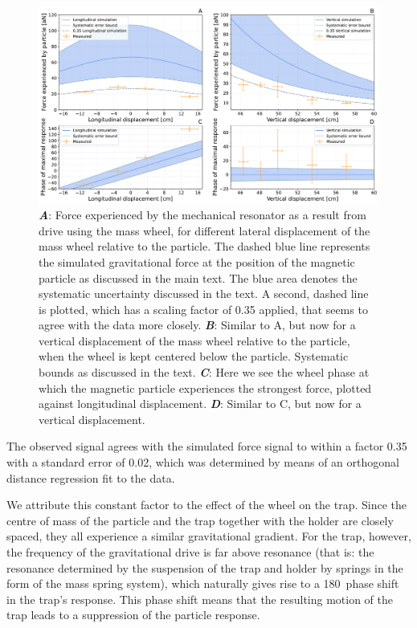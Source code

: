 \begin{figure}[ht]%
\centering
\includegraphics[width=\textwidth]{Results/paper_full_combined.pdf}%
\caption{\textbf{\emph{A}}: Force experienced by the mechanical resonator as a result from drive using the mass wheel, for different lateral displacement of the mass wheel relative to the particle. The dashed blue line represents the simulated gravitational force at the position of the magnetic particle as discussed in the main text. The blue area denotes the systematic uncertainty discussed in the text. A second, dashed line is plotted, which has a scaling factor of 0.35 applied, that seems to agree with the data more closely. \textbf{\emph{B}}: Similar to A, but now for a vertical displacement of the mass wheel relative to the particle, when the wheel is kept centered below the particle. Systematic bounds as discussed in the text.   \textbf{\emph{C}}: Here we see the wheel phase at which the magnetic particle experiences the strongest force, plotted against longitudinal displacement. \textbf{\emph{D}}: Similar to C, but now for a vertical displacement.\\
}\label{fig3:force}
\end{figure}

The observed signal agrees with the simulated force signal to within a factor 0.35 with a standard error of 0.02, which was determined by means of an orthogonal distance regression fit to the data.

We attribute this constant factor to the effect of the wheel on the trap. Since the centre of mass of the particle and the trap together with the holder are closely spaced, they all experience a similar gravitational gradient. For the trap, however, the frequency of the gravitational drive is far above resonance (that is: the resonance determined by the suspension of the trap and holder by springs in the form of the mass spring system), which naturally gives rise to a 180\textdegree\ phase shift in the trap's response. This phase shift means that the resulting motion of the trap leads to a suppression of the particle response.






